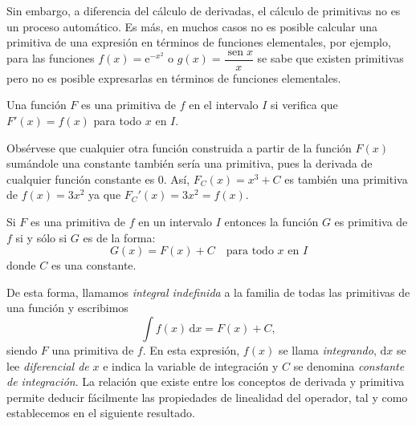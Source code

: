 Sin embargo, a diferencia del cálculo de derivadas, el cálculo de primitivas no es un proceso automático.
Es más, en muchos casos no es posible calcular una primitiva de una expresión en términos de funciones elementales, por ejemplo, para las funciones $f(x)=\mathrm{e}^{-x^2}$ o $g(x)=\dfrac{\operatorname{sen} x}{x}$ se sabe que existen primitivas pero no es posible expresarlas en términos de funciones elementales.
%
\begin{definicion} 
Una función $F$ es una primitiva de $f$ en el intervalo $I$ si verifica que $F'(x)=f(x)$ para todo $x$ en $I$.
\end{definicion}
%
Obsérvese que cualquier otra función construida a partir de la función $F(x)$ sumándole una constante también sería una primitiva,  pues la derivada de cualquier función constante es 0.
Así, $F_C(x)=x^3+C$ es también una primitiva de $f(x)=3x^2$ ya que $F_C'(x)=3x^2=f(x)$.
%
\begin{proposicion} 
Si $F$ es una primitiva de $f$ en un intervalo $I$ entonces la función $G$ es primitiva de $f$ si y sólo si $G$ es de la forma:
$$ G(x)=F(x)+C\quad\text{para todo }x\text{ en }I $$
donde $C$ es una constante.
\end{proposicion}
%
De esta forma, llamamos \emph{integral indefinida} a la familia de todas las primitivas de una función y escribimos
\[
\displaystyle\int f(x)\,\mathrm{d}x = F(x) + C,
\]
siendo $F$ una primitiva de $f$.
En esta expresión, $f(x)$ se llama \emph{integrando}, $\mathrm{d}x$ se lee \emph{diferencial de} $x$ e indica la variable de integración y $C$ se denomina \emph{constante de integración}.
%
La relación que existe entre los conceptos de derivada y primitiva permite deducir fácilmente las propiedades de linealidad del operador, tal y como establecemos en el siguiente resultado.
%

